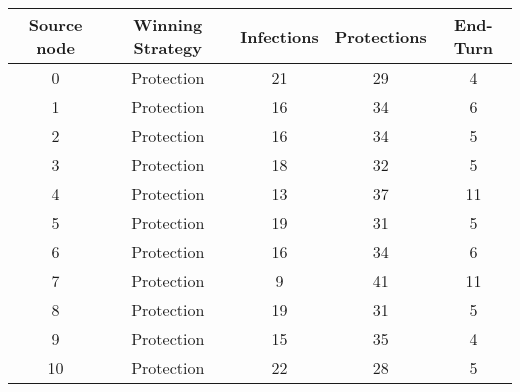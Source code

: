 \documentclass[results.tex]{subfiles}
\begin{document}
    \begin{center}
        \begin{tabular}{| c || c | c | c | c |}
            \hline
            {\bfseries Source node} & {\bfseries Winning Strategy} & {\bfseries Infections} & {\bfseries Protections}
            & {\bfseries End-Turn}
            \\  %
            \hline\hline
            0                       & Protection                   & 21                     & 29                      & 4                    \\
            \hline
            1                       & Protection                   & 16                     & 34                      & 6                    \\
            \hline
            2                       & Protection                   & 16                     & 34                      & 5                    \\
            \hline
            3                       & Protection                   & 18                     & 32                      & 5                    \\
            \hline
            4                       & Protection                   & 13                     & 37                      & 11                   \\
            \hline
            5                       & Protection                   & 19                     & 31                      & 5                    \\
            \hline
            6                       & Protection                   & 16                     & 34                      & 6                    \\
            \hline
            7                       & Protection                   & 9                      & 41                      & 11                   \\
            \hline
            8                       & Protection                   & 19                     & 31                      & 5                    \\
            \hline
            9                       & Protection                   & 15                     & 35                      & 4                    \\
            \hline
            10                      & Protection                   & 22                     & 28                      & 5                    \\

\end{tabular}
\end{center}
\end{document}
